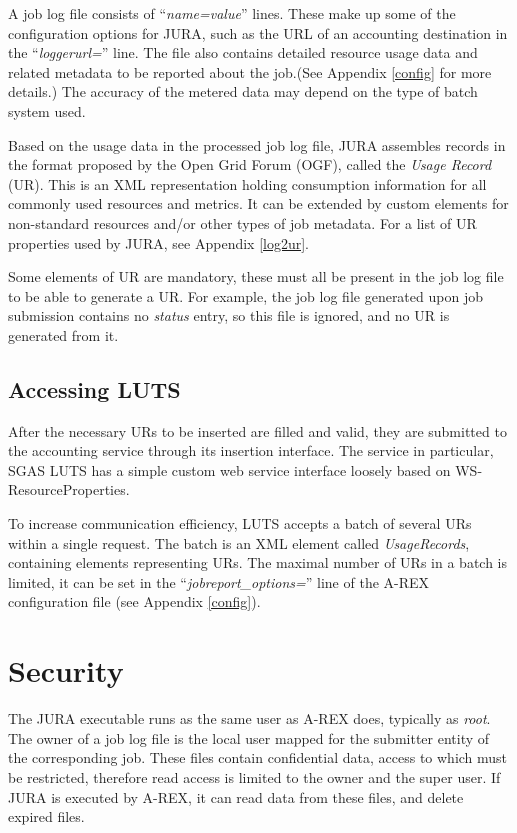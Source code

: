\documentclass{article}                            %
\begin{document}
A job log file consists of ``\textit{name=value}'' lines.  These
make up some of the configuration options for JURA, such as the URL of
an accounting destination in the ``\textit{loggerurl=}'' line.  The
file also contains detailed resource usage data and related metadata
to be reported about the job.(See Appendix \ref{config} for more
details.)  The accuracy of the metered data may depend on the type of
batch system used.

Based on the usage data in the processed job log file, JURA assembles
records in the format proposed by the Open Grid Forum (OGF), called
the \textit{Usage Record} (UR)\cite{ur}. This is an XML representation
holding consumption information for all commonly used resources and
metrics. It can be extended by custom elements for non-standard
resources and/or other types of job metadata. For a list of UR
properties used by JURA, see Appendix \ref{log2ur}.

Some elements of UR are mandatory, these must all be present in the
job log file to be able to generate a UR. For example, the job log
file generated upon job submission contains no \textit{status} entry,
so this file is ignored, and no UR is generated from it.

\subsection{Accessing LUTS}
After the necessary URs to be inserted are filled and valid, they are
submitted to the accounting service through its insertion
interface. The service in particular, SGAS LUTS has a simple custom
web service interface loosely based on WS-ResourceProperties.

To increase communication efficiency, LUTS accepts a batch of several
URs within a single request. The batch is an XML element called
\textit{UsageRecords}, containing elements representing URs. The
maximal number of URs in a batch is limited, it can be set in the
``\textit{jobreport\_options=}'' line of the A-REX configuration file
(see Appendix \ref{config}).

\section{Security}
The JURA executable runs as the same user as A-REX does, typically as
\textit{root}. The owner of a job log file is the local user mapped
for the submitter entity of the corresponding job. These files contain
confidential data, access to which must be restricted, therefore read
access is limited to the owner and the super user. If JURA is executed
by A-REX, it can read data from these files, and delete expired files.
\end{document}
